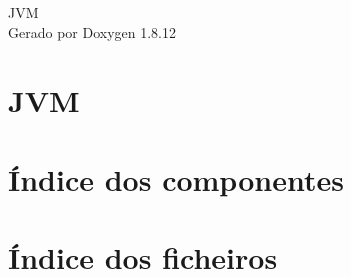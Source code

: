 \documentclass[twoside]{book}
\newcommand{\+}{\discretionary{\mbox{\scriptsize$\hookleftarrow$}}{}{}}
\newcommand{\clearemptydoublepage}{%
  \newpage{\pagestyle{empty}\cleardoublepage}%
}
\begin{document}
\hypersetup{pageanchor=false,
             bookmarksnumbered=true,
             pdfencoding=unicode
            }
\begin{titlepage}
\vspace*{7cm}
\begin{center}%
{\Large J\+VM }\\
\vspace*{1cm}
{\large Gerado por Doxygen 1.8.12}\\
\end{center}
\end{titlepage}
\clearemptydoublepage
{}
\tableofcontents
\clearemptydoublepage
{}
\hypersetup{pageanchor=true}

\chapter{J\+VM}
\label{md__r_e_a_d_m_e}
\hypertarget{md__r_e_a_d_m_e}{}

\chapter{Índice dos componentes}

\chapter{Índice dos ficheiros}

\end{document}
